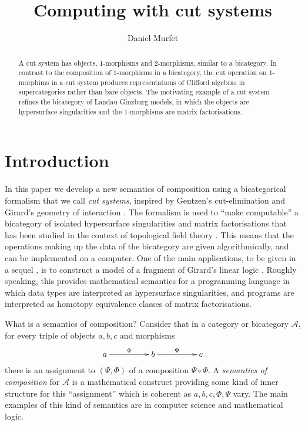 \documentclass[english,letter paper,12pt,leqno]{article}
\theoremstyle{example}
\numberwithin{equation}{section}
\def\res{\operatorname{Res}}
\begin{document}
\def\Res{\res\!}
\newcommand{\ud}{\mathrm{d}}
\newcommand{\Ress}[1]{\res_{#1}\!}
\newcommand{\cat}[1]{\mathcal{#1}}
\newcommand{\lto}{\longrightarrow}
\newcommand{\xlto}[1]{\stackrel{#1}\lto}
\newcommand{\mf}[1]{\mathfrak{#1}}
\newcommand{\md}[1]{\mathscr{#1}}
\def\l{\,|\,}
\def\sgn{\textup{sgn}}

\title{Computing with cut systems}
\author{Daniel Murfet}

\maketitle

\begin{abstract}
A cut system has objects, $1$-morphisms and $2$-morphisms, similar to a bicategory. In contrast to the composition of $1$-morphisms in a bicategory, the cut operation on $1$-morphims in a cut system produces representations of Clifford algebras in supercategories rather than bare objects. The motivating example of a cut system refines the bicategory of Landau-Ginzburg models, in which the objects are hypersurface singularities and the $1$-morphisms are matrix factorisations.
\end{abstract}

\section{Introduction}

In this paper we develop a new semantics of composition using a bicategorical formalism that we call \emph{cut systems}, inspired by Gentzen's cut-elimination \cite{gentzen} and Girard's geometry of interaction \cite{girard_towards}. The formalism is used to ``make computable'' a bicategory of isolated hypersurface singularities and matrix factorisations that has been studied in the context of topological field theory \cite{McNameethesis, cr0909.4381}. This means that the operations making up the data of the bicategory are given algorithmically, and can be implemented on a computer. One of the main applications, to be given in a sequel \cite{cutsystems2}, is to construct a model of a fragment of Girard's linear logic \cite{girard_llogic}. Roughly speaking, this provides mathematical semantics for a programming language in which data types are interpreted as hypersurface singularities, and programs are interpreted as homotopy equivalence classes of matrix factorisations.

What is a semantics of composition? Consider that in a category or bicategory $\cat{A}$, for every triple of objects $a,b,c$ and morphisms
\[
\xymatrix@C+2pc{
a \ar[r]^-{\Phi} & b \ar[r]^-{\Psi} & c
}
\]
there is an assignment to $(\Psi, \Phi)$ of a composition $\Psi \circ \Phi$. A \emph{semantics of composition} for $\cat{A}$ is a mathematical construct providing some kind of inner structure for this ``assignment'' which is coherent as $a,b,c,\Phi,\Psi$ vary. The main examples of this kind of semantics are in computer science and mathematical logic. 
\end{document}
